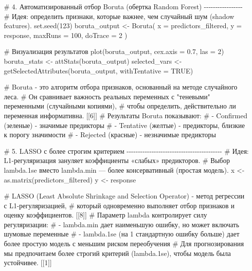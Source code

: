 \documentclass[
  letterpaper,
  DIV=11,
  numbers=noendperiod]{scrreprt}
\newenvironment{Shaded}{\begin{snugshade}}{\end{snugshade}}
\newcommand{\AttributeTok}[1]{\textcolor[rgb]{0.40,0.45,0.13}{#1}}
\newcommand{\CommentTok}[1]{\textcolor[rgb]{0.37,0.37,0.37}{#1}}
\newcommand{\ConstantTok}[1]{\textcolor[rgb]{0.56,0.35,0.01}{#1}}
\newcommand{\DecValTok}[1]{\textcolor[rgb]{0.68,0.00,0.00}{#1}}
\newcommand{\FloatTok}[1]{\textcolor[rgb]{0.68,0.00,0.00}{#1}}
\newcommand{\FunctionTok}[1]{\textcolor[rgb]{0.28,0.35,0.67}{#1}}
\newcommand{\NormalTok}[1]{\textcolor[rgb]{0.00,0.23,0.31}{#1}}
\newcommand{\OtherTok}[1]{\textcolor[rgb]{0.00,0.23,0.31}{#1}}
\begin{document}
\begin{Shaded}
\begin{Highlighting}[]
\CommentTok{\# 4. Автоматизированный отбор Boruta (обертка Random Forest) {-}{-}{-}{-}{-}{-}{-}{-}{-}{-}{-}{-}{-}{-}{-}{-}{-}}
\CommentTok{\# Идея: определить признаки, которые важнее, чем случайный шум (shadow features).}
\FunctionTok{set.seed}\NormalTok{(}\DecValTok{123}\NormalTok{)}
\NormalTok{boruta\_output }\OtherTok{\textless{}{-}} \FunctionTok{Boruta}\NormalTok{(}
  \AttributeTok{x =}\NormalTok{ predictors\_filtered, }
  \AttributeTok{y =}\NormalTok{ response,}
  \AttributeTok{maxRuns =} \DecValTok{100}\NormalTok{,}
  \AttributeTok{doTrace =} \DecValTok{2}
\NormalTok{)}

\CommentTok{\# Визуализация результатов}
\FunctionTok{plot}\NormalTok{(boruta\_output, }\AttributeTok{cex.axis =} \FloatTok{0.7}\NormalTok{, }\AttributeTok{las =} \DecValTok{2}\NormalTok{)}
\NormalTok{boruta\_stats }\OtherTok{\textless{}{-}} \FunctionTok{attStats}\NormalTok{(boruta\_output)}
\NormalTok{selected\_vars }\OtherTok{\textless{}{-}} \FunctionTok{getSelectedAttributes}\NormalTok{(boruta\_output, }\AttributeTok{withTentative =} \ConstantTok{TRUE}\NormalTok{)}

\CommentTok{\# Boruta {-} это алгоритм отбора признаков, основанный на методе случайного леса.}
\CommentTok{\# Он сравнивает важность реальных переменных с "теневыми" переменными (случайными копиями),}
\CommentTok{\# чтобы определить, действительно ли переменная информативна. [[6]]}
\CommentTok{\# Результаты Boruta показывают: }
\CommentTok{\#   {-} Confirmed (зеленые) {-} значимые предикторы}
\CommentTok{\#   {-} Tentative (желтые) {-} предикторы, близкие к порогу значимости}
\CommentTok{\#   {-} Rejected (красные) {-} незначимые предикторы}


\CommentTok{\# 5. LASSO с более строгим критерием {-}{-}{-}{-}{-}{-}{-}{-}{-}{-}{-}{-}{-}{-}{-}{-}{-}{-}{-}{-}{-}{-}{-}{-}{-}{-}{-}{-}{-}{-}{-}{-}{-}{-}{-}{-}{-}{-}{-}{-}{-}{-}}
\CommentTok{\# Идея: L1{-}регуляризация зануляет коэффициенты «слабых» предикторов.}
\CommentTok{\# Выбор lambda.1se вместо lambda.min — более консервативный (простая модель).}
\NormalTok{x }\OtherTok{\textless{}{-}} \FunctionTok{as.matrix}\NormalTok{(predictors\_filtered)}
\NormalTok{y }\OtherTok{\textless{}{-}}\NormalTok{ response}

\CommentTok{\# LASSO (Least Absolute Shrinkage and Selection Operator) {-} метод регрессии с L1{-}регуляризацией,}
\CommentTok{\# который одновременно выполняет отбор признаков и оценку коэффициентов. [[8]]}
\CommentTok{\# Параметр lambda контролирует силу регуляризации:}
\CommentTok{\#   {-} lambda.min дает наименьшую ошибку, но может включать шумовые переменные}
\CommentTok{\#   {-} lambda.1se (на 1 стандартную ошибку больше) дает более простую модель с меньшим риском переобучения}
\CommentTok{\# Для прогнозирования мы предпочитаем более строгий критерий (lambda.1se), чтобы модель была устойчивее. [[1]]}


\end{Highlighting}
\end{Shaded}
\end{document}
